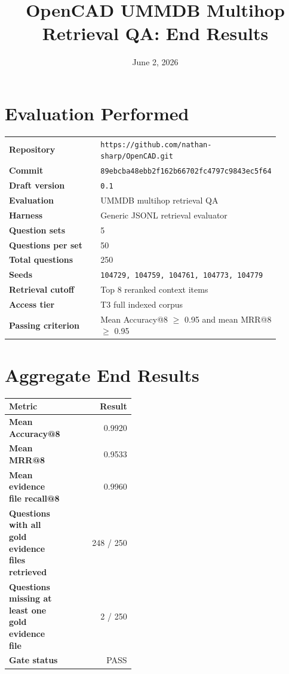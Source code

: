 \documentclass[11pt]{article}
\title{OpenCAD UMMDB Multihop Retrieval QA: End Results}
\author{}
\date{June 2, 2026}
\begin{document}
\maketitle

\section*{Evaluation Performed}
\begin{tabular}{>{\bfseries}p{0.38\linewidth}p{0.52\linewidth}}
Repository & \texttt{https://github.com/nathan-sharp/OpenCAD.git} \\
Commit & \texttt{89ebcba48ebb2f162b66702fc4797c9843ec5f64} \\
Draft version & \texttt{0.1} \\
Evaluation & UMMDB multihop retrieval QA \\
Harness & Generic JSONL retrieval evaluator \\
Question sets & 5 \\
Questions per set & 50 \\
Total questions & 250 \\
Seeds & \texttt{104729, 104759, 104761, 104773, 104779} \\
Retrieval cutoff & Top 8 reranked context items \\
Access tier & T3 full indexed corpus \\
Passing criterion & Mean Accuracy@8 $\geq$ 0.95 and mean MRR@8 $\geq$ 0.95 \\
\end{tabular}

\section*{Aggregate End Results}
\begin{tabular}{>{\bfseries}p{0.42\linewidth}r}
\toprule
Metric & Result \\
\midrule
Mean Accuracy@8 & 0.9920 \\
Mean MRR@8 & 0.9533 \\
Mean evidence file recall@8 & 0.9960 \\
Questions with all gold evidence files retrieved & 248 / 250 \\
Questions missing at least one gold evidence file & 2 / 250 \\
Gate status & PASS \\
\bottomrule
\end{tabular}
\end{document}
